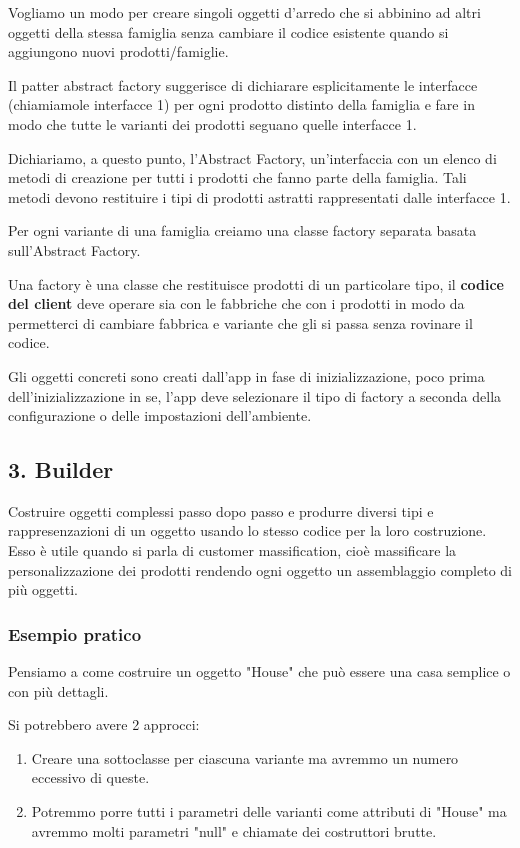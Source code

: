 \documentclass{report}
\begin{document}
\newpage
\noindent
Vogliamo un modo per creare singoli oggetti d'arredo che si abbinino ad altri oggetti della stessa famiglia senza cambiare il codice esistente quando si aggiungono nuovi prodotti/famiglie.

\medskip
\noindent
Il patter abstract factory suggerisce di dichiarare esplicitamente le interfacce (chiamiamole interfacce 1) per ogni prodotto distinto della famiglia e fare in modo che tutte le varianti dei prodotti seguano quelle interfacce 1.

\noindent
Dichiariamo, a questo punto, l'Abstract Factory, un'interfaccia con un elenco di metodi di creazione per tutti i prodotti che fanno parte della famiglia. Tali metodi devono restituire i tipi di prodotti astratti rappresentati dalle interfacce 1.

\noindent
Per ogni variante di una famiglia creiamo una classe factory separata basata sull'Abstract Factory.

\medskip
\noindent
Una factory è una classe che restituisce prodotti di un particolare tipo, il \textbf{codice del client} deve operare sia con le fabbriche che con i prodotti in modo da permetterci di cambiare fabbrica e variante che gli si passa senza rovinare il codice.

\noindent
Gli oggetti concreti sono creati dall'app in fase di inizializzazione, poco prima dell'inizializzazione in se, l'app deve selezionare il tipo di factory a seconda della configurazione o delle impostazioni dell'ambiente.

\subsection*{3. Builder}
Costruire oggetti complessi passo dopo passo e produrre diversi tipi e rappresenzazioni di un oggetto usando lo stesso codice per la loro costruzione. Esso è utile quando si parla di customer massification, cioè massificare la personalizzazione dei prodotti rendendo ogni oggetto un assemblaggio completo di più oggetti.

\subsubsection*{Esempio pratico}
Pensiamo a come costruire un oggetto "House" che può essere una casa semplice o con più dettagli.

\noindent
Si potrebbero avere 2 approcci:
\begin{enumerate}
    \item Creare una sottoclasse per ciascuna variante ma avremmo un numero eccessivo di queste.
    \item Potremmo porre tutti i parametri delle varianti come attributi di "House" ma avremmo molti parametri "null" e chiamate dei costruttori brutte.
\end{enumerate}
\end{document}

